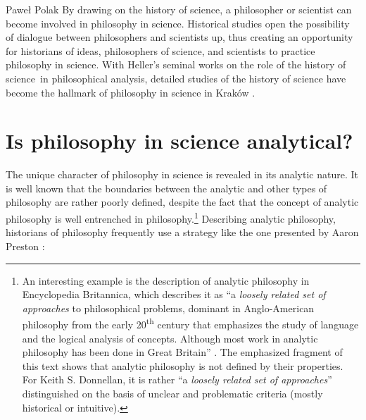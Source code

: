 \begin{artengenv}{Paweł Polak}
By drawing on the history of science, a philosopher or scientist can become involved in philosophy in science.
Historical studies open the possibility of dialogue between philosophers and scientists up, thus creating an
opportunity for historians of ideas, philosophers of science, and scientists to practice philosophy in science. With
Heller’s seminal works on the role of the history of science~in philosophical analysis, detailed studies of the history
of science have become the hallmark of philosophy in science in Kraków
\parencite{pol_polak_tradycja_2018}.

\enlargethispage{1\baselineskip}

\section{Is philosophy in science analytical?}
The unique character of philosophy in science is revealed in its analytic nature. It is well known that the boundaries
between the analytic and other types of philosophy are rather poorly defined, despite the fact that the concept of
analytic philosophy is well entrenched in philosophy.\footnote{An interesting example is the description of analytic
philosophy in Encyclopedia Britannica, which describes it as ``a \textit{loosely related set of approaches} to
philosophical problems, dominant in Anglo-American philosophy from the early 20\textsuperscript{th} century that emphasizes the study of
language and the logical analysis of concepts. Although most work in analytic philosophy has been done in Great
Britain''
\parencite{pol_preston_analytic_nodate}.
The emphasized fragment of this text shows that analytic philosophy is not defined by their
properties. For Keith S. Donnellan, it is rather ``a \textit{loosely related set of approaches}'' distinguished on the
basis of unclear and problematic criteria (mostly historical or intuitive).} Describing
analytic philosophy, historians of philosophy frequently use a strategy like the one presented by Aaron Preston
\parencite*{pol_preston_analytic_nodate}:





\end{artengenv}
